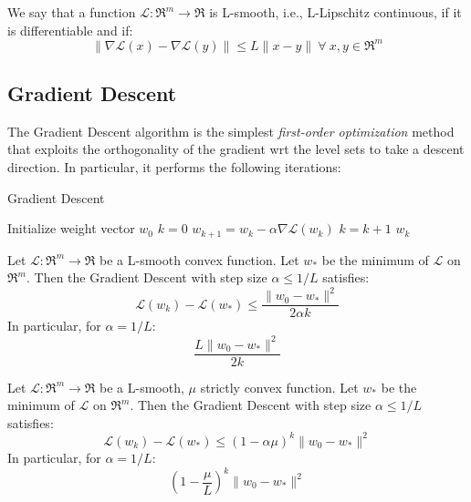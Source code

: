 \begin{definition}[L-smoothness]
We say that a function $\mathcal{L}: \Re^m \rightarrow \Re$ is L-smooth, i.e., L-Lipschitz continuous, if it is differentiable and if:
$$
\| \nabla \mathcal{L}(x) - \nabla \mathcal{L}(y) \| \leq L \| x - y \| \ \forall \ x, y \in \Re^m
$$
\end{definition}

\subsection{Gradient Descent}

The Gradient Descent algorithm is the simplest \emph{first-order optimization} method that exploits the orthogonality of the gradient wrt the level sets to take a descent direction. In particular, it performs the following iterations:

\begin{algorithm}[H]
	\caption{Gradient Descent}
	\label{alg:gd}
	\begin{algorithmic}
			\State Initialize weight vector $w_0$
			\State $k = 0$
				\State $w_{k+1} = w_k - \alpha \nabla \mathcal{L}(w_k)$
				\State $k = k + 1$
			\EndWhile
			\State \Return $w_k$
		\EndFunction
	\end{algorithmic}
\end{algorithm}

\begin{theorem}
Let $\mathcal{L}: \Re^m \rightarrow \Re$ be a L-smooth convex function. Let $w_*$ be the minimum of $\mathcal{L}$ on $\Re^m$. Then the Gradient Descent with step size $\alpha \leq 1/L$ satisfies:
$$
\mathcal{L}(w_k) - \mathcal{L}(w_*) \leq \frac{\| w_0 - w_* \|^2}{2 \alpha k}
$$
In particular, for $\alpha = 1/L$:
$$
\frac{L \| w_0 - w_* \|^2}{2 k}
$$
\end{theorem}

\begin{theorem}
Let $\mathcal{L}: \Re^m \rightarrow \Re$ be a L-smooth, $\mu$ strictly convex function. Let $w_*$ be the minimum of $\mathcal{L}$ on $\Re^m$. Then the Gradient Descent with step size $\alpha \leq 1/L$ satisfies:
$$
\mathcal{L}(w_k) - \mathcal{L}(w_*) \leq (1 - \alpha \mu)^k \| w_0 - w_* \|^2
$$
In particular, for $\alpha = 1/L$:
$$
(1 - \frac{\mu}{L})^k \| w_0 - w_* \|^2
$$
\end{theorem}

